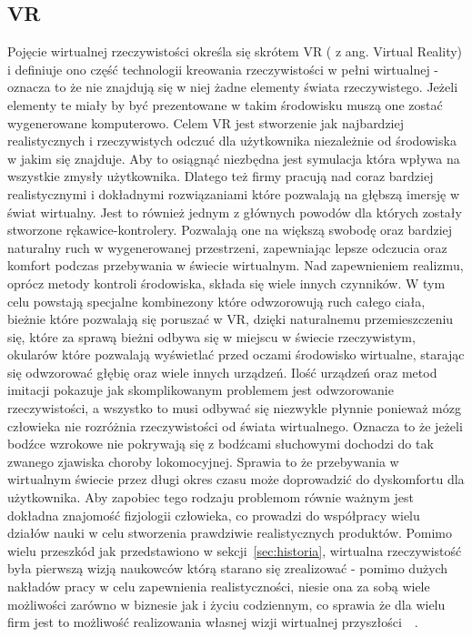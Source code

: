	\subsection{VR}
	\label{subsec:vr}
	Pojęcie wirtualnej rzeczywistości określa się skrótem VR ( z ang. Virtual Reality) i definiuje ono część technologii kreowania rzeczywistości w pełni wirtualnej - oznacza to że nie znajdują się w niej żadne elementy świata rzeczywistego. Jeżeli elementy te miały by być prezentowane w takim środowisku muszą one zostać wygenerowane komputerowo. Celem VR jest stworzenie jak najbardziej realistycznych i rzeczywistych odczuć dla użytkownika niezależnie od środowiska w jakim się znajduje. Aby to osiągnąć niezbędna jest symulacja która wpływa na wszystkie zmysły użytkownika. Dlatego też firmy pracują nad coraz bardziej realistycznymi i dokładnymi rozwiązaniami które pozwalają na głębszą imersję w świat wirtualny. Jest to również jednym z głównych powodów dla których zostały stworzone rękawice-kontrolery. Pozwalają one na większą swobodę oraz bardziej naturalny ruch w  wygenerowanej przestrzeni, zapewniając lepsze odczucia oraz komfort podczas przebywania w świecie wirtualnym. Nad zapewnieniem realizmu, oprócz metody kontroli środowiska, składa się wiele innych czynników. W tym celu powstają specjalne kombinezony które odwzorowują ruch całego ciała, bieżnie które pozwalają się poruszać w VR, dzięki naturalnemu przemieszczeniu się, które za sprawą bieżni odbywa się w miejscu w świecie rzeczywistym, okularów które pozwalają wyświetlać przed oczami środowisko wirtualne, starając się odwzorować głębię oraz wiele innych urządzeń. Ilość urządzeń oraz metod imitacji pokazuje jak skomplikowanym problemem jest odwzorowanie rzeczywistości, a wszystko to musi odbywać się niezwykle płynnie ponieważ mózg człowieka nie rozróżnia rzeczywistości od świata wirtualnego. Oznacza to że jeżeli bodźce wzrokowe nie pokrywają się z bodźcami słuchowymi dochodzi do tak zwanego zjawiska choroby lokomocyjnej. Sprawia to że przebywania w wirtualnym świecie przez długi okres czasu może doprowadzić do dyskomfortu dla użytkownika. Aby zapobiec tego rodzaju problemom równie ważnym jest dokładna znajomość fizjologii człowieka, co prowadzi do współpracy wielu działów nauki w celu stworzenia prawdziwie realistycznych produktów. Pomimo wielu przeszkód jak przedstawiono w sekcji~\ref{sec:historia}, wirtualna rzeczywistość była pierwszą wizją naukowców którą starano się zrealizować - pomimo dużych nakładów pracy w celu zapewnienia realistyczności, niesie ona za sobą wiele możliwości zarówno w biznesie jak i życiu codziennym, co sprawia że dla wielu firm jest to możliwość realizowania własnej wizji wirtualnej przyszłości~\cite{terms}~\cite{chorobaVR}.
